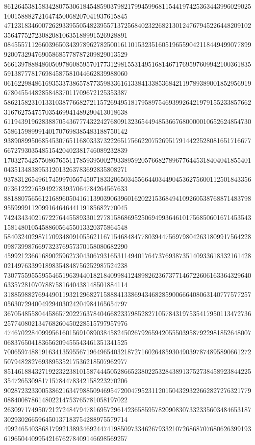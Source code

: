 \begin{DoxyCode}
      861264538158342807530618454859037982179945996811544197425363443996029025100158882721647450068207041937615845
      471231834600726293395505482395571372568402322682130124767945226448209102356477527230820810635188991526928891
      084555711266039650343978962782500161101532351605196559042118449499077899920073294769058685778787209829013529
      566139788848605097860859570177312981553149516814671769597609942100361835591387778176984587581044662839988060
      061622984861693533738657877359833616133841338536842119789389001852956919678045544828584837011709672125353387
      586215823101331038776682721157269495181795897546939926421979155233857662316762754757035469941489290413018638
      611943919628388705436777432242768091323654494853667680000010652624854730558615989991401707698385483188750142
      938908995068545307651168033373222651756622075269517914422528081651716677667279303548515420402381746089232839
      170327542575086765511785939500279338959205766827896776445318404041855401043513483895312013263783692835808271
      937831265496174599705674507183320650345566440344904536275600112501843356073612227659492783937064784264567633
      881880756561216896050416113903906396016202215368494109260538768871483798955999911209916464644119185682770045
      742434340216722764455893301277815868695250694993646101756850601671453543158148010545886056455013320375864548
      584032402987170934809105562116715468484778039447569798042631809917564228098739987669732376957370158080682290
      459921236616890259627304306793165311494017647376938735140933618332161428021497633991898354848756252987524238
      730775595559554651963944018218409984124898262367377146722606163364329640633572810707887581640438148501884114
      318859882769449011932129682715888413386943468285900666408063140777577257056307294004929403024204984165654797
      367054855804458657202276378404668233798528271057843197535417950113472736257740802134768260450228515797957976
      474670228409995616015691089038458245026792659420555039587922981852648007068376504183656209455543461351341525
      700659748819163413595567196496540321872716026485930490397874895890661272507948282769389535217536218507962977
      851461884327192232238101587444505286652380225328438913752738458923844225354726530981715784478342158223270206
      902872323300538621634798850946954720047952311201504329322662827276321779088400878614802214753765781058197022
      263097174950721272484794781695729614236585957820908307332335603484653187302930266596450137183754288975579714
      499246540386817992138934692447419850973346267933210726868707680626399193619650440995421676278409146698569257

\end{DoxyCode}

